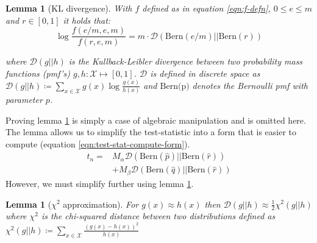 \documentclass[]{article}
\newcommand{\Xcal}{\mathcal{X}}
\newcommand{\kl}{\mathcal{D}}
\newtheorem{lemma}[theorem]{Lemma}
\begin{document}
\begin{multicols*}{2}
\begin{lemma}[KL divergence]
	With $f$ defined as in equation \ref{eqn:f-defn}, $0 \leq e \leq m$ and $r \in [0, 1]$ it holds that:
	\begin{equation*}
		\log \frac{f(e/m, e, m)}{f(r, e, m)} = m \cdot \kl \left( \textrm{Bern}(e/m) || \textrm{Bern}(r) \right)
	\end{equation*}

	where $\kl(g || h)$ is the Kullback-Leibler divergence between two probability mass functions (pmf's) $g, h: \Xcal \mapsto [0, 1]$. $\kl$ is defined in discrete space as $\kl(g || h) \coloneqq \sum_{x \in \Xcal} g(x) \log \frac{g(x)}{h(x)}$ and $\textrm{Bern(p)}$ denotes the Bernoulli pmf with parameter $p$.
	\label{lem:kl-div}
\end{lemma}

Proving lemma \ref{lem:kl-div} is simply a case of algebraic manipulation and is omitted here. The lemma allows us to simplify the test-statistic into a form that is easier to compute (equation \ref{eqn:test-stat-compute-form}).
%
\begin{equation}
	\begin{aligned}
	t_n = &M_\alpha \kl\left( \textrm{Bern}(\hat{p}) || \textrm{Bern}(\hat{r})\right) \\
	&+ M_\beta \kl\left( \textrm{Bern}(\hat{q}) || \textrm{Bern}(\hat{r})\right)
	\end{aligned}
	\label{eqn:test-stat-compute-form}
\end{equation}
%
However, we must simplify further using lemma \ref{lem:kl-approx-chi}.
%
\begin{lemma}[$\chi^2$ approximation]
	\label{lem:kl-approx-chi}
	For $g(x) \approx h(x)$ then $\kl(g || h) \approx \frac{1}{2} \chi^2(g || h)$ where $\chi^2$ is the chi-squared distance between two distributions defined as $\chi^2(g || h) \coloneqq \sum_{x \in \Xcal} \frac{(g(x)-h(x))^2}{h(x)}$ 
\end{lemma}


\end{multicols*}
\end{document}
